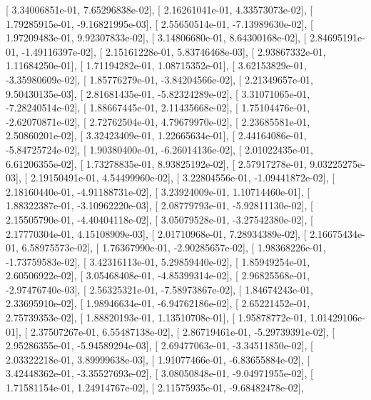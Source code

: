 \documentclass{article}
\begin{document}
       [  3.34006851e-01,   7.65296838e-02],
       [  2.16261041e-01,   4.33573073e-02],
       [  1.79285915e-01,  -9.16821995e-03],
       [  2.55650514e-01,  -7.13989630e-02],
       [  1.97209483e-01,   9.92307833e-02],
       [  3.14806680e-01,   8.64300168e-02],
       [  2.84695191e-01,  -1.49116397e-02],
       [  2.15161228e-01,   5.83746468e-03],
       [  2.93867332e-01,   1.11684250e-01],
       [  1.71194282e-01,   1.08715352e-01],
       [  3.62153829e-01,  -3.35980609e-02],
       [  1.85776279e-01,  -3.84204566e-02],
       [  2.21349657e-01,   9.50430135e-03],
       [  2.81681435e-01,  -5.82324289e-02],
       [  3.31071065e-01,  -7.28240514e-02],
       [  1.88667445e-01,   2.11435668e-02],
       [  1.75104476e-01,  -2.62070871e-02],
       [  2.72762504e-01,   4.79679970e-02],
       [  2.23685581e-01,   2.50860201e-02],
       [  3.32423409e-01,   1.22665634e-01],
       [  2.44164086e-01,  -5.84725724e-02],
       [  1.90380400e-01,  -6.26014136e-02],
       [  2.01022435e-01,   6.61206355e-02],
       [  1.73278835e-01,   8.93825192e-02],
       [  2.57917278e-01,   9.03225275e-03],
       [  2.19150491e-01,   4.54499960e-02],
       [  3.22804556e-01,  -1.09441872e-02],
       [  2.18160440e-01,  -4.91188731e-02],
       [  3.23924009e-01,   1.10714460e-01],
       [  1.88322387e-01,  -3.10962220e-03],
       [  2.08779793e-01,  -5.92811130e-02],
       [  2.15505790e-01,  -4.40404118e-02],
       [  3.05079528e-01,  -3.27542380e-02],
       [  2.17770304e-01,   4.15108909e-03],
       [  2.01710968e-01,   7.28934389e-02],
       [  2.16675434e-01,   6.58975573e-02],
       [  1.76367990e-01,  -2.90285657e-02],
       [  1.98368226e-01,  -1.73759583e-02],
       [  3.42316113e-01,   5.29859440e-02],
       [  1.85949254e-01,   2.60506922e-02],
       [  3.05468408e-01,  -4.85399314e-02],
       [  2.96825568e-01,  -2.97476740e-03],
       [  2.56325321e-01,  -7.58973867e-02],
       [  1.84674243e-01,   2.33695910e-02],
       [  1.98946634e-01,  -6.94762186e-02],
       [  2.65221452e-01,   2.75739353e-02],
       [  1.88820193e-01,   1.13510708e-01],
       [  1.95878772e-01,   1.01429106e-01],
       [  2.37507267e-01,   6.55487138e-02],
       [  2.86719461e-01,  -5.29739391e-02],
       [  2.95286355e-01,  -5.94589294e-03],
       [  2.69477063e-01,  -3.34511850e-02],
       [  2.03322218e-01,   3.89999638e-03],
       [  1.91077466e-01,  -6.83655884e-02],
       [  3.42448362e-01,  -3.35527693e-02],
       [  3.08050848e-01,  -9.04971955e-02],
       [  1.71581154e-01,   1.24914767e-02],
       [  2.11575935e-01,  -9.68482478e-02],
\end{document}
